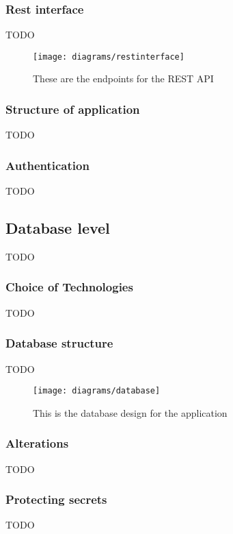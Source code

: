\subsubsection*{Rest interface}

{TODO}

\begin{figure}[H]
    \centering
    \texttt{[image: diagrams/restinterface]}
    \caption{These are the endpoints for the REST API}
    \label{fig:rest_pai_diagram_image}
\end{figure} 
\noindent

\subsubsection*{Structure of application}

{TODO}

\subsubsection*{Authentication}

{TODO}

\subsection{Database level}

{TODO}

\subsubsection*{Choice of Technologies}
\label{sec:database_choice_of_tech}

{TODO}

\subsubsection*{Database structure}

{TODO}

\begin{figure}[H]
    \centering
    \texttt{[image: diagrams/database]}
    \caption{This is the database design for the application}
    \label{fig:diagram_database_image}
\end{figure} 
\noindent

\subsubsection*{Alterations}

{TODO}

\subsubsection*{Protecting secrets}

{TODO}